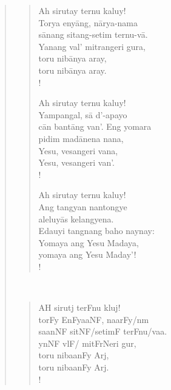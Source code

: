 \documentclass[12pt,paper=a4]{scrartcl}
\begin{document}
\begin{quote}
\begin{minipage}[t]{.5\linewidth}
\begin{verse}
\renewcommand*{\vrightskip}{-2em}
\verselinenumbersleft
{}
\begin{patverse}
Ah sirutay ternu kaluy!\\
Torya enyāng, nārya-nama\\
sānang sitang-setim ternu-vā.\\
Yanang val' mitrangeri gura,\\
toru nibānya aray,\\
toru nibānya aray.\\!
\end{patverse}

\begin{patverse}
Ah sirutay ternu kaluy!\\
Yampangal, sā d'-apayo\\
cān bantāng van'. Eng yomara\\
pidim madānena nana,\\
Yesu, vesangeri vana,\\
Yesu, vesangeri van'.\\!
\end{patverse}

\begin{patverse}
Ah sirutay ternu kaluy!\\
Ang tangyan nantongye\\
aleluyās kelangyena.\\
Edauyi tangnang baho naynay:\\
Yomaya ang Yesu Madaya,\\
yomaya ang Yesu Maday'!\\!
\end{patverse}
\end{verse}
\end{minipage}
~
\begin{minipage}[t]{.5\linewidth}
\Tagati %
\begin{verse}
\begin{patverse}
AH sirutj terFnu kluj!\\
torFy EnFyaaNF, naarFy/nm\\
saanNF sitNF/setimF terFnu/vaa.\\
ynNF vlF/ mitFrNeri gur,\\
toru nibaanFy Arj,\\
toru nibaanFy Arj.\\!
\end{patverse}


\end{verse}
\end{minipage}
\end{quote}
\end{document}
